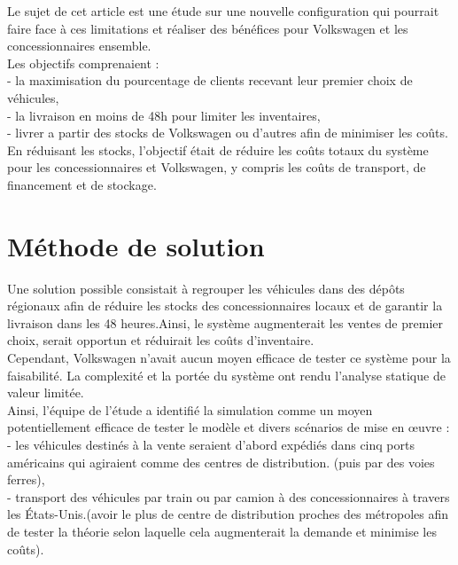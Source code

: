 \documentclass{ceri}
\begin{document}
Le sujet de cet article est une étude sur une nouvelle configuration qui pourrait faire face à ces limitations et réaliser des bénéfices pour Volkswagen et les concessionnaires ensemble.\\

Les objectifs comprenaient :\\
- la maximisation du pourcentage de clients recevant leur premier choix de véhicules,\\
- la livraison en moins de 48h pour limiter les inventaires,\\
- livrer a partir des stocks de Volkswagen ou d'autres afin de minimiser les coûts.\\


En réduisant les stocks, l'objectif était de réduire les coûts totaux du système pour les concessionnaires et Volkswagen, y compris les coûts de transport, de financement et de stockage.\\

\clearpage
\bigskip

\section{Méthode de solution}

Une solution possible consistait à regrouper les véhicules dans des dépôts régionaux afin de réduire les stocks des concessionnaires locaux et de garantir la livraison dans les 48 heures.Ainsi, le système augmenterait les ventes de premier choix, serait opportun et réduirait les coûts d'inventaire.\\


Cependant, Volkswagen n'avait aucun moyen efficace de tester ce système pour la faisabilité. La complexité et la portée du système ont rendu l'analyse statique de valeur limitée.\\


Ainsi, l'équipe de l'étude a identifié la simulation comme un moyen potentiellement efficace de tester le modèle et divers scénarios de mise en œuvre :\\
- les véhicules destinés à la vente seraient d'abord expédiés dans cinq ports américains qui agiraient comme des centres de distribution. (puis par des voies ferres),\\
- transport des véhicules par train ou par camion à des concessionnaires à travers les États-Unis.(avoir le plus de centre de distribution proches des métropoles afin de tester la théorie selon laquelle cela augmenterait la demande et minimise les coûts).\\
\end{document}
